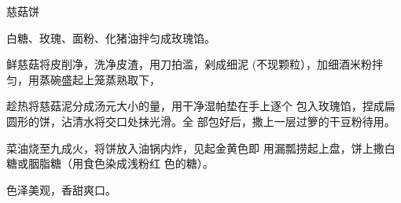 \begin{recipe}{慈菇饼}

\ingredients


\cooking

\step 	白糖、玫瑰、面粉、化猪油拌匀成玫瑰馅。

\step 	鲜慈菇将皮削净，洗净皮渣，用刀拍滥，剁成细泥 (不现颗粒），加细酒米粉拌匀，用蒸碗盛起上笼蒸熟取下，

趁热将慈菇泥分成汤元大小的量，用干净湿帕垫在手上逐个 包入玫瑰馅，捏成扁圆形的饼，沾清水将交口处抹光滑。全 部包好后，撒上一层过箩的干豆粉待用。

菜油烧至九成火，将饼放入油锅内炸，见起金黄色即 用漏瓢捞起上盘，饼上撒白糖或胭脂糖（用食色染成浅粉红 色的糖）。	

\notes

色泽美观，香甜爽口。

\end{recipe}

